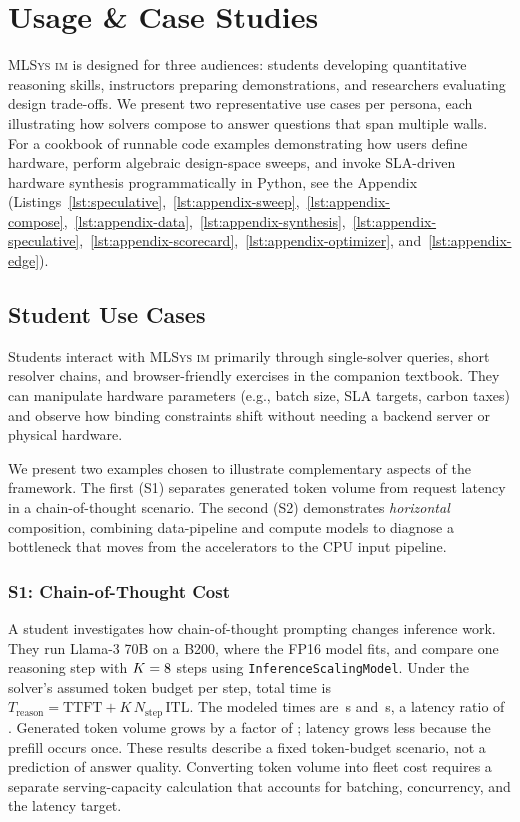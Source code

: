 \documentclass[10pt,twocolumn]{article}
\newcommand{\mlsysim}{\mbox{\textsc{MLSys}\,\textperiodcentered\,\textsc{im}}\xspace}
\begin{document}
\section{Usage \& Case Studies}
\label{sec:usage}

\mlsysim is designed for three audiences: students developing quantitative reasoning skills, instructors preparing demonstrations, and researchers evaluating design trade-offs. We present two representative use cases per persona, each illustrating how solvers compose to answer questions that span multiple walls. For a cookbook of runnable code examples demonstrating how users define hardware, perform algebraic design-space sweeps, and invoke SLA-driven hardware synthesis programmatically in Python, see the Appendix (Listings~\ref{lst:speculative},~\ref{lst:appendix-sweep},~\ref{lst:appendix-compose},~\ref{lst:appendix-data},~\ref{lst:appendix-synthesis},~\ref{lst:appendix-speculative},~\ref{lst:appendix-scorecard},~\ref{lst:appendix-optimizer}, and~\ref{lst:appendix-edge}).

\subsection{Student Use Cases}

Students interact with \mlsysim primarily through single-solver queries, short resolver chains, and browser-friendly exercises in the companion textbook. They can manipulate hardware parameters (e.g., batch size, SLA targets, carbon taxes) and observe how binding constraints shift without needing a backend server or physical hardware.

We present two examples chosen to illustrate complementary aspects of the framework. The first (S1) separates generated token volume from request latency in a chain-of-thought scenario. The second (S2) demonstrates \emph{horizontal} composition, combining data-pipeline and compute models to diagnose a bottleneck that moves from the accelerators to the CPU input pipeline.

\subsubsection{S1: Chain-of-Thought Cost}
A student investigates how chain-of-thought prompting changes inference work. They run Llama-3 70B on a B200, where the FP16 model fits, and compare one reasoning step with $K=8$ steps using \texttt{InferenceScalingModel}. Under the solver's assumed token budget per step, total time is $T_{\text{reason}}=\text{TTFT}+K\,N_{\text{step}}\,\text{ITL}$. The modeled times are \CaseSOneSingleStepSeconds\,s and \CaseSOneTotalSeconds\,s, a latency ratio of \CaseSOneLatencyMultiplier. Generated token volume grows by a factor of \CaseSOneTokenMultiplier; latency grows less because the prefill occurs once. These results describe a fixed token-budget scenario, not a prediction of answer quality. Converting token volume into fleet cost requires a separate serving-capacity calculation that accounts for batching, concurrency, and the latency target.
\end{document}
